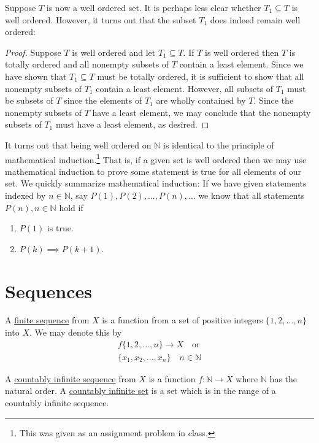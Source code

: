 \documentclass[12pt]{article}
\newlength\tindent
\renewcommand{\indent}{\hspace*{\tindent}}
\newcommand{\N}{\mathbb N}
\begin{document}
\indent Suppose $T$ is now a well ordered set. It is perhaps less clear whether $T_1 \subseteq T$ is well ordered. However, it turns out that the subset $T_1$ does indeed remain well ordered:
\begin{proof} Suppose $T$ is well ordered and let $T_1 \subseteq T$. If $T$ is well ordered then $T$ is totally ordered and all nonempty subsets of $T$ contain a least element. Since we have shown that $T_1 \subseteq T$ must be totally ordered, it is sufficient to show that all nonempty subsets of $T_1$ contain a least element. However, all subsets of $T_1$ must be subsets of $T$ since the elements of $T_1$ are wholly contained by $T$. Since the nonempty subsets of $T$ have a least element, we may conclude that the nonempty subsets of $T_1$ must have a least element, as desired.
\end{proof}

\indent It turns out that being well ordered on $\N$ is identical to the principle of mathematical induction.\footnote{This was given as an assignment problem in class.} That is, if a given set is well ordered then we may use mathematical induction to prove some statement is true for all elements of our set. We quickly summarize mathematical induction: If we have given statements indexed by $n \in \N$, say $P(1), P(2), ..., P(n),...$ we know that all statements $P(n), n \in \N$ hold if
\begin{enumerate}
	\item $P(1)$ is true.
	\item $P(k) \implies P(k + 1)$.
\end{enumerate}


\section{Sequences}

\indent A \underline{finite sequence} from $X$ is a function from a set of positive integers $\{1,2,...,n\}$ into $X$. We may denote this by
\begin{align*}
	f\{1,2,..., n\} \longrightarrow X \quad \text{or} \\
	\{x_1, x_2, ..., x_n\} \quad n \in \N
\end{align*}

\indent A \underline{countably infinite sequence} from $X$ is a function $f:\N\to X$ where $\N$ has the natural order. A \underline{countably infinite set} is a set which is in the range of a countably infinite sequence. \\
\end{document}

